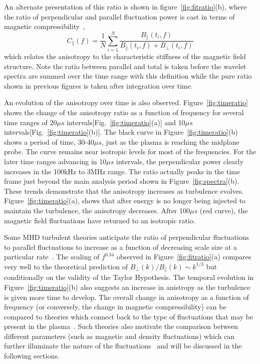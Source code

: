 \documentclass[preprint2]{aastex}
\begin{document}
An alternate presentation of this ratio is shown in figure~\ref{fig:fitratio}(b), where the ratio of perpendicular and parallel fluctuation power is cast in terms of magnetic compressibility~\citep{kiy13},
\begin{equation}
C_{\parallel}(f) = \frac{1}{N}\sum^{N}_{i=1}\frac{B_{\parallel}(t_{i},f)}{B_{\parallel}(t_{i},f)+B_{\perp}(t_{i},f)}
\label{eq:magcompress}
\end{equation}
which relates the anisotropy to the characteristic stiffness of the magnetic field structure. Note the ratio between parallel and total is taken before the wavelet spectra are summed over the time range with this definition while the pure ratio shown in previous figures is taken after integration over time.

An evolution of the anisotropy over time is also observed. Figure~\ref{fig:timeratio} shows the change of the anisotropy ratio as a function of frequency for several time ranges of 20$\mu s$ intervals[Fig.~\ref{fig:timeratio}(a)] and 10$\mu s$ intervals[Fig.~\ref{fig:timeratio}(b)]. The black curve in Figure~\ref{fig:timeratio}(b) shows a period of time, 30-40$\mu s$, just as the plasma is reaching the midplane probe. The curve remains near isotropic levels for most of the frequencies. For the later time ranges advancing in 10$\mu s$ intervals, the perpendicular power clearly increases in the 100kHz to 3MHz range. The ratio actually peaks in the time frame just beyond the main analysis period shown in Figure~\ref{fig:spectra}(b). These trends demonstrate that the anisotropy increases as turbulence evolves. Figure~\ref{fig:timeratio}(a), shows that after energy is no longer being injected to maintain the turbulence, the anisotropy decreases. After 100$\mu s$ (red curve), the magnetic field fluctuations have returned to an isotropic ratio.

Some MHD turbulent theories anticipate the ratio of perpendicular fluctuations to parallel fluctuations to increase as a function of decreasing scale size at a particular rate~\citep{sri95,bol06}. The scaling of $f^{0.34}$ observed in Figure~\ref{fig:fitratio}(a) compares very well to the theoretical prediction of $B_{\perp}(k)/B_{\parallel}(k) \sim k^{1/3}$ but conditionally on the validity of the Taylor Hypothesis. The temporal evolution in Figure~\ref{fig:timeratio}(b) also suggests an increase in anistropy as the turbulence is given more time to develop. The overall change in anisotropy as a function of frequency (or conversely, the change in magnetic compressibility) can be compared to theories which connect back to the type of fluctuations that may be present in the plasma~\citep{ten12,kiy13}. Such theories also motivate the comparison between different parameters (such as magnetic and density fluctuations) which can further illuminate the nature of the fluctuations~\citep{kle12} and will be discussed in the following sections.
\end{document}
